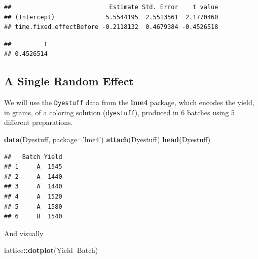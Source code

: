 \documentclass[]{book}
\newenvironment{Shaded}{\begin{snugshade}}{\end{snugshade}}
\newcommand{\DataTypeTok}[1]{\textcolor[rgb]{0.13,0.29,0.53}{#1}}
\newcommand{\KeywordTok}[1]{\textcolor[rgb]{0.13,0.29,0.53}{\textbf{#1}}}
\newcommand{\NormalTok}[1]{#1}
\newcommand{\OperatorTok}[1]{\textcolor[rgb]{0.81,0.36,0.00}{\textbf{#1}}}
\newcommand{\OtherTok}[1]{\textcolor[rgb]{0.56,0.35,0.01}{#1}}
\newcommand{\StringTok}[1]{\textcolor[rgb]{0.31,0.60,0.02}{#1}}
\theoremstyle{definition}
\theoremstyle{definition}
\theoremstyle{definition}
\theoremstyle{remark}
\begin{document}
\begin{verbatim}
##                           Estimate Std. Error    t value
## (Intercept)              5.5544195  2.5513561  2.1770460
## time.fixed.effectBefore -0.2118132  0.4679384 -0.4526518
\end{verbatim}

\begin{Shaded}
\end{Shaded}

\begin{verbatim}
##         t 
## 0.4526514
\end{verbatim}

\hypertarget{a-single-random-effect}{%
\subsection{A Single Random Effect}\label{a-single-random-effect}}

We will use the \texttt{Dyestuff} data from the \textbf{lme4} package, which encodes the yield, in grams, of a coloring solution (\texttt{dyestuff}), produced in 6 batches using 5 different preparations.

\begin{Shaded}
\begin{Highlighting}[]
\KeywordTok{data}\NormalTok{(Dyestuff, }\DataTypeTok{package=}\StringTok{'lme4'}\NormalTok{)}
\KeywordTok{attach}\NormalTok{(Dyestuff)}
\KeywordTok{head}\NormalTok{(Dyestuff)}
\end{Highlighting}
\end{Shaded}

\begin{verbatim}
##   Batch Yield
## 1     A  1545
## 2     A  1440
## 3     A  1440
## 4     A  1520
## 5     A  1580
## 6     B  1540
\end{verbatim}

And visually

\begin{Shaded}
\begin{Highlighting}[]
\NormalTok{lattice}\OperatorTok{::}\KeywordTok{dotplot}\NormalTok{(Yield}\OperatorTok{~}\NormalTok{Batch)}
\end{Highlighting}
\end{Shaded}
\end{document}
